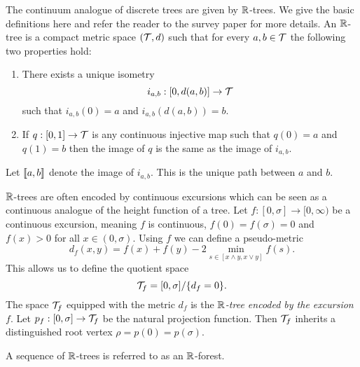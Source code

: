 The continuum analogue of discrete trees are given by ${\mathbb R}$-trees. We give the basic definitions here and refer the reader to the survey paper \cite{legallRandomTreesApplications2005} for more details. An ${\mathbb R}$-tree is a compact metric space $({\mathcal T}, d)$ such that for every $a, b \in {\mathcal T}$ the following two properties hold:
\begin{enumerate}
    \item There exists a unique isometry $$i_{a, b} : [0, d(a, b)] \to {\mathcal T}$$ such that $i_{a, b}(0) = a$ and $i_{a, b}(d(a, b)) = b$.
    \item If $q: [0, 1] \to {\mathcal T}$ is any continuous injective map such that $q(0) = a$ and $q(1) = b$ then the image of $q$ is the same as the image of $i_{a, b}$.
\end{enumerate}
Let $\llbracket a, b\rrbracket$ denote the image of $i_{a, b}$. This is the unique path between $a$ and $b$.

${\mathbb R}$-trees are often encoded by continuous excursions which can be seen as a continuous analogue of the height function of a tree. Let $f: [0, \sigma] \to [0, \infty)$ be a continuous excursion, meaning $f$ is continuous, $f(0) = f(\sigma) = 0$ and $f(x) > 0$ for all $x \in (0, \sigma)$. Using $f$ we can define a pseudo-metric
\begin{equation*}
    d_f(x, y) = f(x) + f(y) - 2 \min_{s \in [x \wedge y, x \vee y]} f(s).
\end{equation*}
This allows us to define the quotient space
\begin{equation*}
    {\mathcal T}_f = [0, \sigma] / \{d_f = 0\}.
\end{equation*}
The space ${\mathcal T}_f$ equipped with the metric $d_f$ is the \emph{${\mathbb R}$-tree encoded by the excursion $f$}. Let $p_f: [0, \sigma] \to {\mathcal T}_f$ be the natural projection function. Then ${\mathcal T}_f$ inherits a distinguished root vertex $\rho = p(0) = p(\sigma)$.

A sequence of ${\mathbb R}$-trees is referred to as an ${\mathbb R}$-forest.